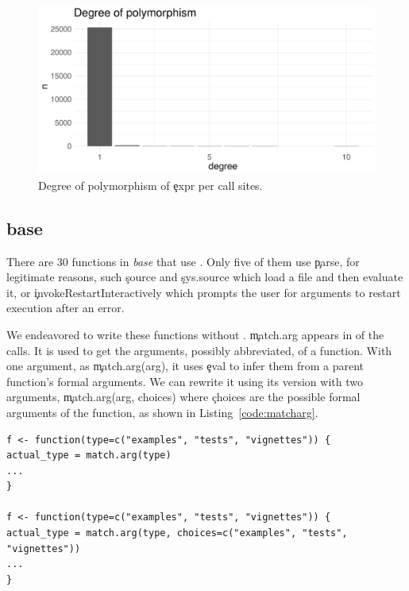 \documentclass[conference]{IEEEtran}
\begin{document}
\begin{figure}[!h]
	\centering
    \includegraphics[width=\columnwidth]{polymorphism}
    \caption{Degree of polymorphism of \c{expr} per call sites.} \label{fig:polymorphism}
\end{figure}

\subsection{base}

There are 30 functions in \emph{base} that use \eval. Only five of them use \c{parse}, for legitimate reasons, such \c{source} and \c{sys.source} which load a file and then evaluate it, or \c{invokeRestartInteractively} which prompts the user for arguments to restart execution after an error.

We endeavored  to write these functions without \eval. \c{match.arg} appears in \MatchArgPercent of the \eval calls. It is used to get the arguments, possibly abbreviated, of a function. With one argument, as \c{match.arg(arg)}, it uses \c{eval} to infer them from a parent function's formal arguments. We can rewrite it using its version with two arguments, \c{match.arg(arg, choices)} where \c{choices} are the possible formal arguments of the function, as shown in Listing~\ref{code:matcharg}.

\begin{lstlisting}[caption={Rewriting \c{match.arg} without \eval}, label=code:matcharg]
f <- function(type=c("examples", "tests", "vignettes")) {
actual_type = match.arg(type)
...
}

f <- function(type=c("examples", "tests", "vignettes")) {
actual_type = match.arg(type, choices=c("examples", "tests", "vignettes"))
...
}
\end{lstlisting}
\end{document}
